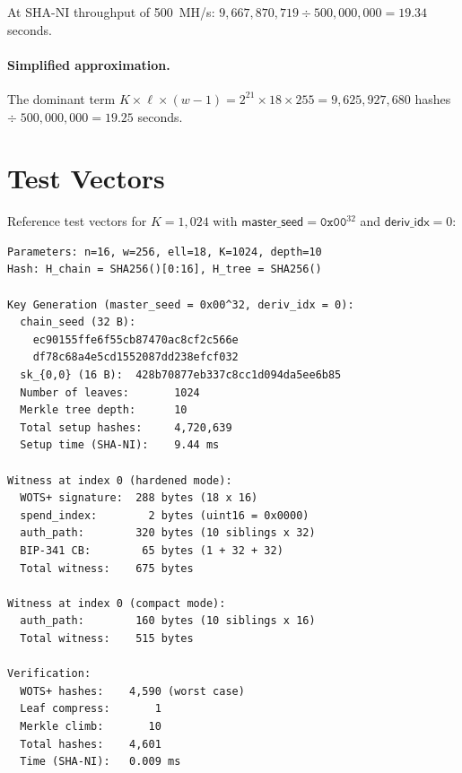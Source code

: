 \documentclass[11pt,a4paper]{article}
\theoremstyle{definition}
\begin{document}
At SHA-NI throughput of 500~MH/s: $9{,}667{,}870{,}719 \div 500{,}000{,}000 = 19.34$ seconds.

\paragraph{Simplified approximation.} The dominant term $K \times \ell \times (w-1) = 2^{21} \times 18 \times 255 = 9{,}625{,}927{,}680$ hashes $\div\; 500{,}000{,}000 = 19.25$ seconds.

\section{Test Vectors}
\label{app:test-vectors}

Reference test vectors for $K = 1{,}024$ with $\mathsf{master\_seed} = \texttt{0x00}^{32}$ and $\mathsf{deriv\_idx} = 0$:

\begin{lstlisting}[language={},basicstyle=\small\ttfamily,numbers=none]
Parameters: n=16, w=256, ell=18, K=1024, depth=10
Hash: H_chain = SHA256()[0:16], H_tree = SHA256()

Key Generation (master_seed = 0x00^32, deriv_idx = 0):
  chain_seed (32 B):
    ec90155ffe6f55cb87470ac8cf2c566e
    df78c68a4e5cd1552087dd238efcf032
  sk_{0,0} (16 B):  428b70877eb337c8cc1d094da5ee6b85
  Number of leaves:       1024
  Merkle tree depth:      10
  Total setup hashes:     4,720,639
  Setup time (SHA-NI):    9.44 ms

Witness at index 0 (hardened mode):
  WOTS+ signature:  288 bytes (18 x 16)
  spend_index:        2 bytes (uint16 = 0x0000)
  auth_path:        320 bytes (10 siblings x 32)
  BIP-341 CB:        65 bytes (1 + 32 + 32)
  Total witness:    675 bytes

Witness at index 0 (compact mode):
  auth_path:        160 bytes (10 siblings x 16)
  Total witness:    515 bytes

Verification:
  WOTS+ hashes:    4,590 (worst case)
  Leaf compress:       1
  Merkle climb:       10
  Total hashes:    4,601
  Time (SHA-NI):   0.009 ms
\end{lstlisting}



\end{document}
